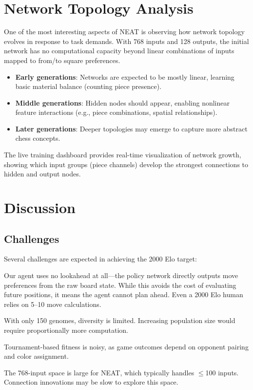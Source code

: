\documentclass[11pt, twocolumn]{article}
\begin{document}
\section{Network Topology Analysis}
\label{sec:topology}

One of the most interesting aspects of NEAT is observing how network topology evolves in response to task demands. With 768 inputs and 128 outputs, the initial network has no computational capacity beyond linear combinations of inputs mapped to from/to square preferences.

\begin{itemize}[leftmargin=*, itemsep=2pt]
    \item \textbf{Early generations}: Networks are expected to be mostly linear, learning basic material balance (counting piece presence).
    \item \textbf{Middle generations}: Hidden nodes should appear, enabling nonlinear feature interactions (e.g., piece combinations, spatial relationships).
    \item \textbf{Later generations}: Deeper topologies may emerge to capture more abstract chess concepts.
\end{itemize}

The live training dashboard provides real-time visualization of network growth, showing which input groups (piece channels) develop the strongest connections to hidden and output nodes.

\section{Discussion}
\label{sec:discussion}

\subsection{Challenges}
Several challenges are expected in achieving the 2000 Elo target:

\begin{description}[leftmargin=1em, itemsep=2pt]
    \item[Search depth] Our agent uses no lookahead at all---the policy network directly outputs move preferences from the raw board state. While this avoids the cost of evaluating future positions, it means the agent cannot plan ahead. Even a 2000 Elo human relies on 5--10 move calculations.
    \item[Population pressure] With only 150 genomes, diversity is limited. Increasing population size would require proportionally more computation.
    \item[Evaluation noise] Tournament-based fitness is noisy, as game outcomes depend on opponent pairing and color assignment.
    \item[Scalability] The 768-input space is large for NEAT, which typically handles $\leq$100 inputs. Connection innovations may be slow to explore this space.
\end{description}
\end{document}
